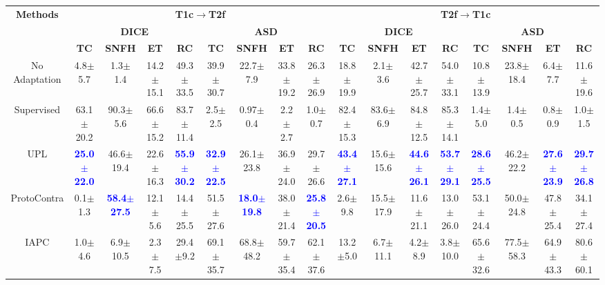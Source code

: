 \begin{table}[tbp]
{\begin{tabular}{@{}c@{\hspace{0.3cm}} cccccccc cccccccc@{}}
\midrule
\midrule

\multirow{3}{*}{\textbf{Methods}} & \multicolumn{8}{c}{\textbf{T1c$\rightarrow$T2f}} & \multicolumn{8}{c}{\textbf{T2f$\rightarrow$T1c}} \\
\cmidrule(lr){2-9} \cmidrule(lr){10-17}
& \multicolumn{4}{c}{\textbf{DICE}} & \multicolumn{4}{c}{\textbf{ASD}} & \multicolumn{4}{c}{\textbf{DICE}} & \multicolumn{4}{c}{\textbf{ASD}} \\
\cmidrule(lr){2-5} \cmidrule(lr){6-9} \cmidrule(lr){10-13} \cmidrule(lr){14-17}
& \textbf{TC} & \textbf{SNFH} & \textbf{ET} & \textbf{RC} & \textbf{TC} & \textbf{SNFH} & \textbf{ET} & \textbf{RC} & \textbf{TC} & \textbf{SNFH} & \textbf{ET} & \textbf{RC} & \textbf{TC} & \textbf{SNFH} & \textbf{ET} & \textbf{RC} \\ 
\midrule

No Adaptation & 4.8$\pm$5.7 & 1.3$\pm$1.4 & 14.2$\pm$15.1 & 49.3$\pm$33.5 & 39.9$\pm$30.7 & 22.7$\pm$7.9 &33.8$\pm$19.2 & 26.3$\pm$26.9 & 18.8$\pm$19.9 & 2.1$\pm$3.6 & 42.7$\pm$25.7 & 54.0$\pm$33.1 & 10.8$\pm$13.9 & 23.8$\pm$18.4 & 6.4$\pm$7.7 & 11.6$\pm$19.6 \\

Supervised & 63.1$\pm$20.2 & 90.3$\pm$5.6 &66.6$\pm$15.2 &83.7$\pm$11.4&2.5$\pm$2.5& 0.97$\pm$0.4& 2.2$\pm$2.7 &1.0$\pm$0.7& 82.4$\pm$15.3 & 83.6$\pm$6.9& 84.8$\pm$12.5&85.3$\pm$14.1 & 1.4$\pm$5.0& 1.4$\pm$0.5&0.8$\pm$0.9 &1.0$\pm$1.5 \\ \midrule

UPL \cite{upl} &\textcolor{blue}{\textbf{25.0$\pm$22.0}} &46.6$\pm$19.4 &22.6$\pm$16.3 &\textcolor{blue}{\textbf{55.9$\pm$30.2}}& \textcolor{blue}{\textbf{32.9$\pm$22.5}} & {26.1$\pm$23.8} &36.9$\pm$24.0 &29.7$\pm$26.6 & \textcolor{blue}{\textbf{43.4$\pm$27.1}} & 15.6$\pm$15.6 & \textcolor{blue}{\textbf{44.6$\pm$26.1}} & \textcolor{blue}{\textbf{53.7$\pm$29.1}} & \textcolor{blue}{\textbf{28.6$\pm$25.5}} & 46.2$\pm$22.2 & \textcolor{blue}{\textbf{27.6$\pm$23.9}} & \textcolor{blue}{\textbf{29.7$\pm$26.8}} \\

ProtoContra \cite{protocontra} & {0.1$\pm$1.3} & \textcolor{blue}{\textbf{58.4$\pm$27.5}} & 12.1$\pm$5.6 & 14.4$\pm$25.5 & {51.5$\pm$27.6}& \textcolor{blue}{\textbf{18.0$\pm$19.8}} & 38.0$\pm$21.4 & \textcolor{blue}{\textbf{25.8$\pm$20.5}} & 2.6$\pm$9.8 & 15.5$\pm$17.9 & 11.6$\pm$21.1 & 13.0$\pm$26.0 &{53.1$\pm$24.4} & 50.0$\pm$24.8 & 47.8$\pm$25.4 & 34.1$\pm$27.4 \\

IAPC \cite{IAPC} & 1.0$\pm$4.6 & 6.9$\pm$10.5 & 2.3$\pm$7.5 & 29.4$\pm$9.2 & 69.1$\pm$35.7 & 68.8$\pm$48.2 & 59.7$\pm$35.4 & 62.1$\pm$37.6 & 13.2$\pm$5.0 & 6.7$\pm$11.1 & 4.2$\pm$8.9 & 3.8$\pm$10.0 & 65.6$\pm$32.6 & 77.5$\pm$58.3 & 64.9$\pm$43.3 & 80.6$\pm$60.1 \\


\end{tabular}}
\end{table}
